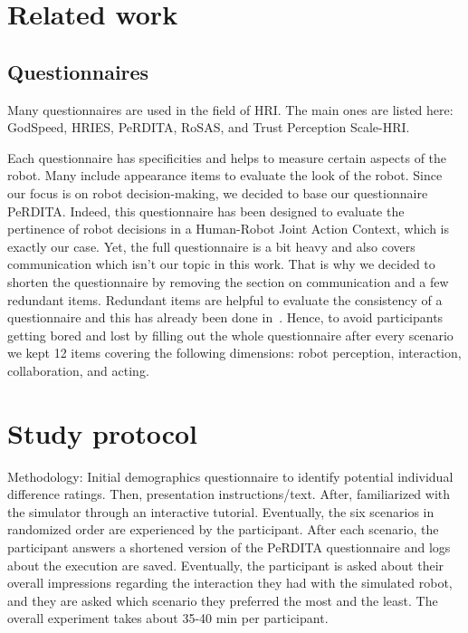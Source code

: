 \section{Related work}

\subsection{Questionnaires}
Many questionnaires are used in the field of HRI. The main ones are listed here: GodSpeed, HRIES, PeRDITA, RoSAS, and Trust Perception Scale-HRI. 

Each questionnaire has specificities and helps to measure certain aspects of the robot. Many include appearance items to evaluate the look of the robot. Since our focus is on robot decision-making, we decided to base our questionnaire PeRDITA. Indeed, this questionnaire has been designed to evaluate the pertinence of robot decisions in a Human-Robot Joint Action Context, which is exactly our case. Yet, the full questionnaire is a bit heavy and also covers communication which isn't our topic in this work. 
That is why we decided to shorten the questionnaire by removing the section on communication and a few redundant items. Redundant items are helpful to evaluate the consistency of a questionnaire and this has already been done in~\cite{devin_evaluating_2018}. Hence, to avoid participants getting bored and lost by filling out the whole questionnaire after every scenario we kept 12 items covering the following dimensions: robot perception, interaction, collaboration, and acting.



\section{Study protocol}

Methodology: 
Initial demographics questionnaire to identify potential individual difference ratings. Then, presentation instructions/text. After, familiarized with the simulator through an interactive tutorial. Eventually, the six scenarios in randomized order are experienced by the participant. After each scenario, the participant answers a shortened version of the PeRDITA questionnaire and logs about the execution are saved. Eventually, the participant is asked about their overall impressions regarding the interaction they had with the simulated robot, and they are asked which scenario they preferred the most and the least. The overall experiment takes about 35-40 min per participant. 

